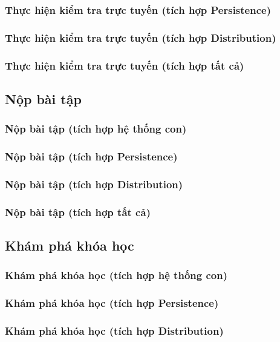 \documentclass[./../main.tex]{subfiles}
\begin{document}
\subsubsection{Thực hiện kiểm tra trực tuyến (tích hợp Persistence)}
\subsubsection{Thực hiện kiểm tra trực tuyến (tích hợp Distribution)}
\subsubsection{Thực hiện kiểm tra trực tuyến (tích hợp tất cả)}

\subsection{Nộp bài tập}
\subsubsection{Nộp bài tập (tích hợp hệ thống con)}
\subsubsection{Nộp bài tập (tích hợp Persistence)}
\subsubsection{Nộp bài tập (tích hợp Distribution)}
\subsubsection{Nộp bài tập (tích hợp tất cả)}

\subsection{Khám phá khóa học}
\subsubsection{Khám phá khóa học (tích hợp hệ thống con)}
\subsubsection{Khám phá khóa học (tích hợp Persistence)}
\subsubsection{Khám phá khóa học (tích hợp Distribution)}
\end{document}
